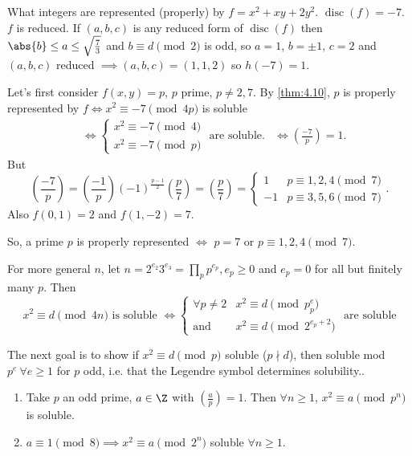 \documentclass{article}
\newcommand{\legendre}[2]{\genfrac{(}{)}{}{}{#1}{#2}}
\DeclareMathOperator{\disc}{disc}
\begin{document}
\begin{eg}
    What integers are represented (properly) by $f = x^2 + xy + 2y^2$. $\disc(f) = -7$.
    $f$ is reduced. If $(a, b, c)$ is any reduced form of $\disc(f)$ then $\abs{b} \leq a \leq \sqrt{\frac{7}{3}}$ and $b \equiv d \pmod{2}$ is odd, so $a = 1$, $b = \pm 1$, $c = 2$ and $(a, b, c)$ reduced $\implies (a, b, c) = (1, 1, 2)$ so $h(-7) = 1$.

    Let's first consider $f(x,y) = p$, $p$ prime, $p \neq 2, 7$.
    By \cref{thm:4.10}, $p$ is properly represented by $f \iff x^2 \equiv -7 \pmod{4p}$ is soluble
    \begin{align*}
        &\iff \begin{cases} x^2 \equiv -7 \pmod{4} \\ x^2 \equiv -7 \pmod{p}\end{cases} \text{ are soluble}.
        &\iff \legendre{-7}{p} = 1.
    \end{align*}
    But
    \begin{equation*}
        \legendre{-7}{p} = \legendre{-1}{p} (-1)^\frac{p-1}{2} \legendre{p}{7} = \legendre{p}{7} = \begin{cases}1 & p \equiv 1,2,4 \pmod{7} \\ -1 & p \equiv 3,5,6 \pmod{7}\end{cases}.
    \end{equation*}
    Also $f(0, 1) = 2$ and $f(1, -2) = 7$.

    So, a prime $p$ is properly represented $\iff$ $p = 7 \text{ or } p \equiv 1, 2, 4 \pmod{7}$.
\end{eg}
For more general $n$, let $n = 2^{e_2} 3^{e_3} = \prod_p p^{e_p}, e_p \geq 0$ and $e_p = 0$ for all but finitely many $p$.
Then
\begin{equation*}
    x^2 \equiv d \pmod{4n}\text{ is soluble } \iff
    \begin{cases}
        \forall p \neq 2 & x^2 \equiv d \pmod{p^e_p} \\
        \text{and} & x^2 \equiv d \pmod{2^{e_p + 2}}
    \end{cases}
    \text{ are soluble}
\end{equation*}

The next goal is to show if $x^2 \equiv d \pmod{p}$ soluble ($p \nmid d$), then soluble mod $p^e\ \forall e \geq 1$ for $p$ odd, i.e. that the Legendre symbol determines solubility..

\begin{nlemma}\label{lem:4.11}
    \begin{enumerate}[label=(\roman*)]
        \item Take $p$ an odd prime, $a \in \Z$ with $\legendre{a}{p} = 1$.
            Then $\forall n \geq 1$, $x^2 \equiv a \pmod{p^n}$ is soluble.
        \item $a \equiv 1 \pmod{8} \implies x^2 \equiv a \pmod{2^n}$ soluble $\forall n \geq 1$.
    \end{enumerate}
\end{nlemma}
\end{document}
